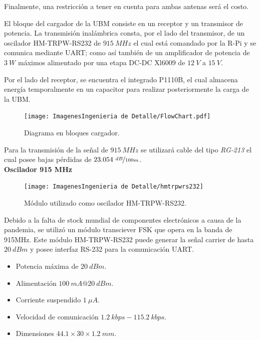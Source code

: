 Finalmente, una restricción a tener en cuenta para ambas antenas será el costo.


El bloque del cargador de la UBM consiste en un receptor y un transmisor de potencia. La transmisión inalámbrica consta, por el lado del transmisor, de un oscilador HM-TRPW-RS232 de $915 \ MHz$ el cual está comandado por la R-Pi y se comunica mediante UART; como así también de un amplificador de potencia de $3 \ W$ máximos alimentado por una etapa DC-DC Xl6009 de $12 \ V$ a $15 \ V$.

Por el lado del receptor, se encuentra el integrado P1110B, el cual almacena energía temporalmente en un capacitor para realizar posteriormente la carga de la UBM.

\begin{figure}[H]
	\centering	
	\texttt{[image: ImagenesIngenieria de Detalle/FlowChart.pdf]}
	\caption{Diagrama en bloques cargador.}
	\label{fig:diagrama_hardware_antenas}
\end{figure}

Para la transmisión de la señal de $915 \ MHz$ se utilizará cable del tipo \textit{RG-213} el cual posee bajas pérdidas de $23.054 \ \nicefrac{dB}{100m}$.\\

\textbf{Oscilador 915 MHz}

\begin{figure}[H]
	\centering	
	\texttt{[image: ImagenesIngenieria de Detalle/hmtrpwrs232]}
	\caption{Módulo utilizado como oscilador HM-TRPW-RS232.}
	\label{fig:oscilador}
\end{figure}

Debido a la falta de stock mundial de componentes electrónicos a causa de la pandemia, se utilizó un módulo transciever FSK que opera en la banda de 915MHz. Este módulo HM-TRPW-RS232 puede generar la señal carrier de hasta $20 \ dBm$ y posee interfaz RS-232 para la comunicación UART.

\begin{itemize}
	\item Potencia máxima de $20 \ dBm$.
	\item Alimentación $100 \ mA@20 \ dBm$.
	\item Corriente suspendido $1 \ \mu A$.
	\item Velocidad de comunicación $1.2 \ kbps - 115.2 \ kbps$.
	\item Dimensiones $44.1 \times 30  \times 1.2 \ mm$.
\end{itemize}

